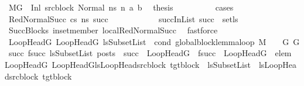 \begin{isabellebody}
\ {\isacartoucheopen}M{\isacharcomma}{\kern0pt}{\isasymLambda}{\isacharcomma}{\kern0pt}{\isasymGamma}{\isacharcomma}{\kern0pt}{\isasymOmega}{\isacharcomma}{\kern0pt}G\ {\isasymturnstile}\ {\isacharparenleft}{\kern0pt}Inl\ src{\isacharunderscore}{\kern0pt}block{\isacharcomma}{\kern0pt}\ Normal\ ns{\isacharparenright}{\kern0pt}\ {\isacharminus}{\kern0pt}n{\isasymrightarrow}\ {\isacharparenleft}{\kern0pt}a{\isacharcomma}{\kern0pt}\ b{\isacharparenright}{\kern0pt}{\isacartoucheclose}\ \isamarkupfalse%
\ {\isacharquery}{\kern0pt}thesis\isanewline
\ \ \ \ \ \ \ \ \isamarkupfalse%
\ {\isacharparenleft}{\kern0pt}cases{\isacharparenright}{\kern0pt}\isanewline
\ \ \ \ \ \ \ \ \ \ \isamarkupfalse%
\ {\isacharparenleft}{\kern0pt}RedNormalSucc\ cs\ ns{\isacharprime}{\kern0pt}\ succ{\isacharparenright}{\kern0pt}\isanewline
\ \ \ \ \ \ \ \ \ \ \isamarkupfalse%
\ succInList{\isacharcolon}{\kern0pt}\ {\isachardoublequoteopen}succ\ {\isasymin}\ set{\isacharparenleft}{\kern0pt}ls{\isacharparenright}{\kern0pt}{\isachardoublequoteclose}\isanewline
\ \ \ \ \ \ \ \ \ \ \ \ \isamarkupfalse%
\ SuccBlocks\ in{\isacharunderscore}{\kern0pt}set{\isacharunderscore}{\kern0pt}member\ local{\isachardot}{\kern0pt}RedNormalSucc{\isacharparenleft}{\kern0pt}{}{\isacharparenright}{\kern0pt}\ \isamarkupfalse%
\ fastforce\isanewline
\isanewline
\ \ \ \ \ \ \ \ \ \ \isamarkupfalse%
\ LoopHeadG\ LoopHeadG{\isacharprime}{\kern0pt}\ lsSubsetList\ \ cond{\isacharcolon}{\kern0pt}\ {\isachardoublequoteopen}global{\isacharunderscore}{\kern0pt}block{\isacharunderscore}{\kern0pt}lemma{\isacharunderscore}{\kern0pt}loop\ M\ {\isasymLambda}\ {\isasymGamma}\ {\isasymOmega}\ G\ G{\isacharprime}{\kern0pt}\ succ\ {\isacharparenleft}{\kern0pt}f{\isacharparenleft}{\kern0pt}succ{\isacharparenright}{\kern0pt}{\isacharparenright}{\kern0pt}\ lsSubsetList\ posts\ {\isasymor}\ {\isacharparenleft}{\kern0pt}succ\ {\isacharequal}{\kern0pt}\ LoopHeadG\ {\isasymand}\ f{\isacharparenleft}{\kern0pt}succ{\isacharparenright}{\kern0pt}\ {\isacharequal}{\kern0pt}\ LoopHeadG{\isacharprime}{\kern0pt}{\isacharparenright}{\kern0pt}{\isachardoublequoteclose}\ \ elem{\isacharcolon}{\kern0pt}\ {\isachardoublequoteopen}{\isacharparenleft}{\kern0pt}LoopHeadG{\isacharcomma}{\kern0pt}\ LoopHeadG{\isacharprime}{\kern0pt}{\isacharparenright}{\kern0pt}{\isasymin}{\isacharparenleft}{\kern0pt}lsLoopHead{\isasymunion}{\isacharbraceleft}{\kern0pt}{\isacharparenleft}{\kern0pt}src{\isacharunderscore}{\kern0pt}block{\isacharcomma}{\kern0pt}\ tgt{\isacharunderscore}{\kern0pt}block{\isacharparenright}{\kern0pt}{\isacharbraceright}{\kern0pt}{\isacharparenright}{\kern0pt}\ {\isasymand}\ lsSubsetList\ {\isasymsubseteq}\ lsLoopHead{\isasymunion}{\isacharbraceleft}{\kern0pt}{\isacharparenleft}{\kern0pt}src{\isacharunderscore}{\kern0pt}block{\isacharcomma}{\kern0pt}\ tgt{\isacharunderscore}{\kern0pt}block{\isacharparenright}{\kern0pt}{\isacharbraceright}{\kern0pt}{\isachardoublequoteclose}\isanewline

\end{isabellebody}
